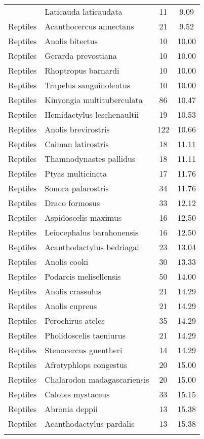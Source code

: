 \begin{longtable}{llcc}
{  Reptiles & Laticauda laticaudata &  11 & 9.09 \\ 
  Reptiles & Acanthocercus annectans &  21 & 9.52 \\ 
  Reptiles & Anolis bitectus &  10 & 10.00 \\ 
  Reptiles & Gerarda prevostiana &  10 & 10.00 \\ 
  Reptiles & Rhoptropus barnardi &  10 & 10.00 \\ 
  Reptiles & Trapelus sanguinolentus &  10 & 10.00 \\ 
  Reptiles & Kinyongia multituberculata &  86 & 10.47 \\ 
  Reptiles & Hemidactylus leschenaultii &  19 & 10.53 \\ 
  Reptiles & Anolis brevirostris & 122 & 10.66 \\ 
  Reptiles & Caiman latirostris &  18 & 11.11 \\ 
  Reptiles & Thamnodynastes pallidus &  18 & 11.11 \\ 
  Reptiles & Ptyas multicincta &  17 & 11.76 \\ 
  Reptiles & Sonora palarostris &  34 & 11.76 \\ 
  Reptiles & Draco formosus &  33 & 12.12 \\ 
  Reptiles & Aspidoscelis maximus &  16 & 12.50 \\ 
  Reptiles & Leiocephalus barahonensis &  16 & 12.50 \\ 
  Reptiles & Acanthodactylus bedriagai &  23 & 13.04 \\ 
  Reptiles & Anolis cooki &  30 & 13.33 \\ 
  Reptiles & Podarcis melisellensis &  50 & 14.00 \\ 
  Reptiles & Anolis crassulus &  21 & 14.29 \\ 
  Reptiles & Anolis cupreus &  21 & 14.29 \\ 
  Reptiles & Perochirus ateles &  35 & 14.29 \\ 
  Reptiles & Pholidoscelis taeniurus &  21 & 14.29 \\ 
  Reptiles & Stenocercus guentheri &  14 & 14.29 \\ 
  Reptiles & Afrotyphlops congestus &  20 & 15.00 \\ 
  Reptiles & Chalarodon madagascariensis &  20 & 15.00 \\ 
  Reptiles & Calotes mystaceus &  33 & 15.15 \\ 
  Reptiles & Abronia deppii &  13 & 15.38 \\ 
  Reptiles & Acanthodactylus pardalis &  13 & 15.38 \\ 
}
\end{longtable}

